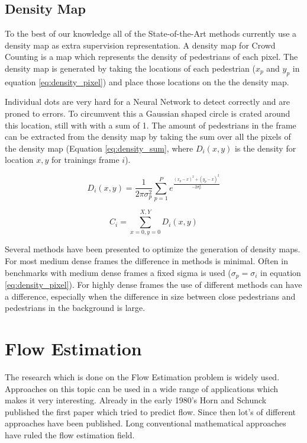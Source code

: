 \subsection{Density Map}
To the best of our knowledge all of the State-of-the-Art methods currently use a density map as extra supervision representation. A density map for Crowd Counting is a map which represents the density of pedestrians of each pixel. The density map is generated by taking the locations of each pedestrian ($x_p$ and $y_p$ in equation \ref{eq:density_pixel}) and place those locations on the the density map.

Individual dots are very hard for a Neural Network to detect correctly and are proned to errors. To circumvent this a Gaussian shaped circle is crated around this location, still with with a sum of 1. The amount of pedestrians in the frame can be extracted from the density map by taking the sum over all the pixels of the density map (Equation \ref{eq:density_sum}, where $D_i(x,y)$ is the density for location $x,y$ for trainings frame $i$).

\begin{equation}
\label{eq:density_pixel}
	D_i(x,y) = \frac{1}{2 \pi \sigma_p^2}\sum^P_{p=1} e^{\frac{(x_p-x)^2+(y_p-x)^2}{-2 \sigma_p^2}}
\end{equation}

\begin{equation}
	\label{eq:density_sum}
	C_i = \sum_{x=0,y=0}^{X,Y} D_i(x,y)
\end{equation}

Several methods have been presented to optimize the generation of density maps. For most medium dense frames the difference in methods is minimal. Often in benchmarks with medium dense frames a fixed sigma is used ($\sigma_p=\sigma_i$ in equation \ref{eq:density_pixel}). For highly dense frames the use of different methods can have a difference, especially when the difference in size between close pedestrians and pedestrians in the background is large.

\section{Flow Estimation}
The research which is done on the Flow Estimation problem is widely used. Approaches on this topic can be used in a wide range of applications which makes it very interesting. Already in the early 1980's Horn and Schunck \cite{Horn1981} published the first paper which tried to predict flow. Since then lot's of different approaches have been published. Long conventional mathematical approaches have ruled the flow estimation field.


